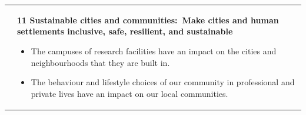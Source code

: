 \documentclass[../SustainableHEP.tex]{subfiles}
\begin{document}
\begin{longtable*}{l l}
\parbox[t]{\SDGleft\textwidth}{} & \parbox[t]{\SDGright\textwidth}{\textbf{11 Sustainable cities and communities:\ Make cities and human settlements inclusive, safe, resilient, and sustainable}
\begin{itemize}[leftmargin=20pt]
\item The campuses of research facilities have an impact on the cities and neighbourhoods that they are built in.
\item The behaviour and lifestyle choices of our community in professional and private lives have an impact on our local communities.
\end{itemize}}\\


\end{longtable*}
\end{document}
